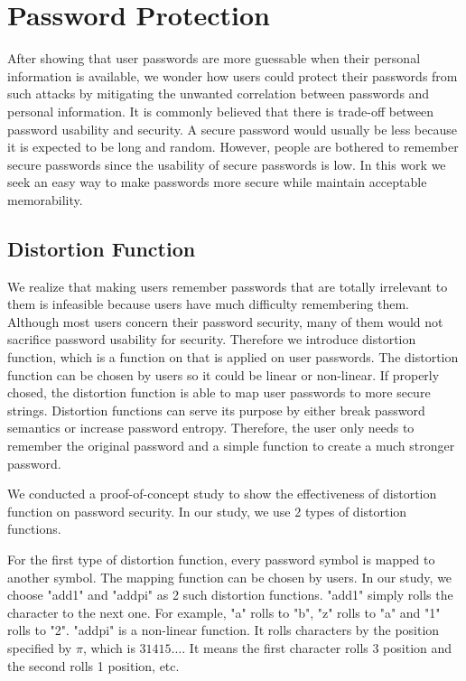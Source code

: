 \section{Password Protection}
\label{passwordprotection}
After showing that user passwords are more guessable when their personal information is available, we wonder how users could protect their passwords from such attacks by mitigating the unwanted correlation between passwords and personal information. It is commonly believed that there is trade-off between password usability and security. A secure password would usually be less because it is expected to be long and random. However, people are bothered to remember secure passwords since the usability of secure passwords is low. In this work we seek an easy way to make passwords more secure while maintain acceptable memorability.

\subsection{Distortion Function}
We realize that making users remember passwords that are totally irrelevant to them is infeasible because users have much difficulty remembering them. Although most users concern their password security, many of them would not sacrifice password usability for security. Therefore we introduce distortion function, which is a function on that is applied on user passwords. The distortion function can be chosen by users so it could be linear or non-linear. If properly chosed, the distortion function is able to map user passwords to more secure strings. Distortion functions can serve its purpose by either break password semantics or increase password entropy. Therefore, the user only needs to remember the original password and a simple function to create a much stronger password. 

We conducted a proof-of-concept study to show the effectiveness of distortion function on password security. In our study, we use 2 types of distortion functions. 

For the first type of distortion function, every password symbol is mapped to another symbol. The mapping function can be chosen by users. In our study, we choose "add1" and "addpi" as 2 such distortion functions. "add1" simply rolls the character to the next one. For example, "a" rolls to "b", "z" rolls to "a" and "1" rolls to "2". "addpi" is a non-linear function. It rolls characters by the position specified by $\pi$, which is $31415 \ldots$. It means the first character rolls 3 position and the second rolls 1 position, etc.


